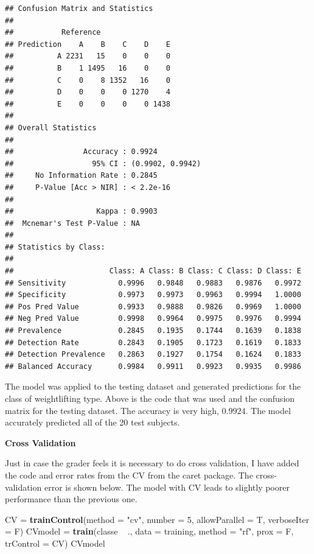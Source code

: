 \documentclass[]{article}
\newenvironment{Shaded}{\begin{snugshade}}{\end{snugshade}}
\newcommand{\KeywordTok}[1]{\textcolor[rgb]{0.13,0.29,0.53}{\textbf{{#1}}}}
\newcommand{\DataTypeTok}[1]{\textcolor[rgb]{0.13,0.29,0.53}{{#1}}}
\newcommand{\DecValTok}[1]{\textcolor[rgb]{0.00,0.00,0.81}{{#1}}}
\newcommand{\StringTok}[1]{\textcolor[rgb]{0.31,0.60,0.02}{{#1}}}
\newcommand{\NormalTok}[1]{{#1}}
\begin{document}
\begin{verbatim}
## Confusion Matrix and Statistics
## 
##           Reference
## Prediction    A    B    C    D    E
##          A 2231   15    0    0    0
##          B    1 1495   16    0    0
##          C    0    8 1352   16    0
##          D    0    0    0 1270    4
##          E    0    0    0    0 1438
## 
## Overall Statistics
##                                           
##                Accuracy : 0.9924          
##                  95% CI : (0.9902, 0.9942)
##     No Information Rate : 0.2845          
##     P-Value [Acc > NIR] : < 2.2e-16       
##                                           
##                   Kappa : 0.9903          
##  Mcnemar's Test P-Value : NA              
## 
## Statistics by Class:
## 
##                      Class: A Class: B Class: C Class: D Class: E
## Sensitivity            0.9996   0.9848   0.9883   0.9876   0.9972
## Specificity            0.9973   0.9973   0.9963   0.9994   1.0000
## Pos Pred Value         0.9933   0.9888   0.9826   0.9969   1.0000
## Neg Pred Value         0.9998   0.9964   0.9975   0.9976   0.9994
## Prevalence             0.2845   0.1935   0.1744   0.1639   0.1838
## Detection Rate         0.2843   0.1905   0.1723   0.1619   0.1833
## Detection Prevalence   0.2863   0.1927   0.1754   0.1624   0.1833
## Balanced Accuracy      0.9984   0.9911   0.9923   0.9935   0.9986
\end{verbatim}

The model was applied to the testing dataset and generated predictions
for the class of weightlifting type. Above is the code that was used and
the confusion matrix for the testing dataset. The accuracy is very high,
\(0.9924\). The model accurately predicted all of the 20 test subjects.

\textbf{Cross Validation}

Just in case the grader feels it is necessary to do cross validation, I
have added the code and error rates from the CV from the caret package.
The cross-validation error is shown below. The model with CV leads to
slightly poorer performance than the previous one.

\begin{Shaded}
\begin{Highlighting}[]
\NormalTok{CV =}\StringTok{ }\KeywordTok{trainControl}\NormalTok{(}\DataTypeTok{method =} \StringTok{"cv"}\NormalTok{, }\DataTypeTok{number =} \DecValTok{5}\NormalTok{, }\DataTypeTok{allowParallel =} \NormalTok{T, }\DataTypeTok{verboseIter =} \NormalTok{F)}
\NormalTok{CVmodel =}\StringTok{ }\KeywordTok{train}\NormalTok{(classe ~}\StringTok{ }\NormalTok{., }\DataTypeTok{data =} \NormalTok{training, }\DataTypeTok{method =} \StringTok{"rf"}\NormalTok{, }\DataTypeTok{prox =} \NormalTok{F, }\DataTypeTok{trControl =} \NormalTok{CV)}
\NormalTok{CVmodel}
\end{Highlighting}
\end{Shaded}
\end{document}
